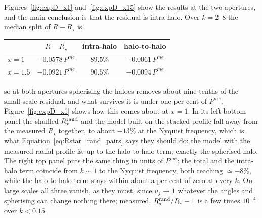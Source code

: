 \documentclass{article}
\begin{document}
Figures~\ref{fig:expD_x1} and~\ref{fig:expD_x15} show the results at the
two apertures, and the main conclusion is that the residual is intra-halo. Over $k =
2$--$8$ the median split of $R - R_\star$ is
\begin{center}
\renewcommand{\arraystretch}{1.2}
\begin{tabular}{lccc}
\hline
 & $R-R_\star$ & intra-halo & halo-to-halo \\
\hline
$x=1$   & $-0.0578\,P^{me}$ & $89.5\%$ & $-0.0061\,P^{me}$ \\
$x=1.5$ & $-0.0921\,P^{me}$ & $90.5\%$ & $-0.0094\,P^{me}$ \\
\hline
\end{tabular}
\end{center}
so at both apertures spherising the haloes removes about nine tenths of the
small-scale residual, and what survives it is under one per cent of $P^{me}$.
Figure~\ref{fig:expD_x1} shows how this comes about at $x = 1$. In its left
bottom panel the shuffled $R_\star^{\rm rand}$ and the model built on the
stacked profile fall away from the measured $R_\star$ together, to about
$-13\%$ at the Nyquist frequency, which is what
Equation~\eqref{eq:Rstar_rand_pairs} says they should do: the model with the
measured radial profile is, up to the halo-to-halo term, exactly the spherised
halo. The right top panel puts the same thing in units of
$P^{me}$: the total and the intra-halo term coincide from $k\sim1$ to the
Nyquist frequency, both reaching $\simeq -8\%$, while the halo-to-halo term
stays within about a per cent of zero at every $k$. On large scales all three
vanish, as they must, since $u_j \to 1$ whatever the angles and spherising
can change nothing there; measured, $R_\star^{\rm rand}/R_\star - 1$ is a few
times $10^{-4}$ over $k < 0.15$.
\end{document}
